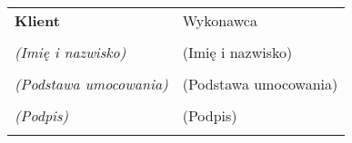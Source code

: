 
\mbox{}\vfill %
\begin{tabu}{X X} \tabucline{}
	\rowfont[c]\bfseries Klient & Wykonawca \\
	[10pt]\makebox[8cm]{\hrulefill} & \makebox[8cm]{\hrulefill} \\
	\rowfont[c]\itshape (Imię i nazwisko) & (Imię i nazwisko) \\
	[10pt]\makebox[8cm]{\hrulefill} & \makebox[8cm]{\hrulefill} \\
	\rowfont[c]\itshape (Podstawa umocowania) & (Podstawa umocowania) \\
	[10pt]\makebox[8cm]{\hrulefill} & \makebox[8cm]{\hrulefill} \\
	\rowfont[c]\itshape (Podpis) & (Podpis) \\[4cm] \\
\end{tabu}
\pagebreak

